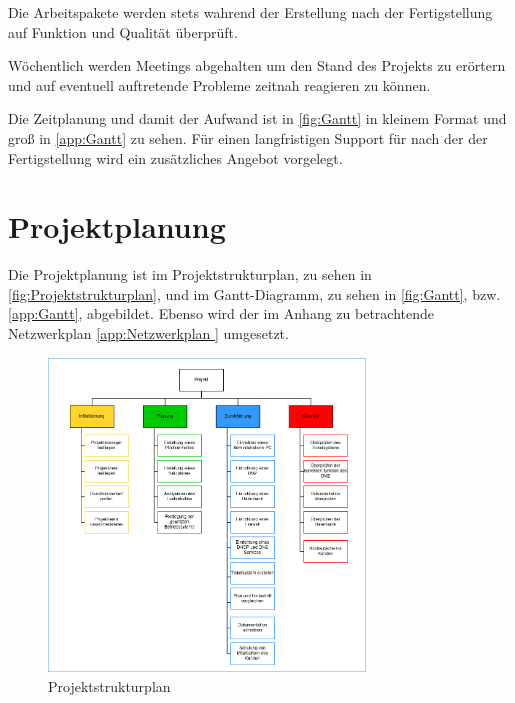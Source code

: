 \documentclass[a4paper,12pt,headings=small,ngerman,bibliography=totoc]{scrartcl}
\begin{document}
Die Arbeitspakete werden stets wahrend der Erstellung nach der Fertigstellung auf Funktion und Qualität überprüft.

Wöchentlich werden Meetings abgehalten um den Stand des Projekts zu erörtern und auf eventuell auftretende Probleme zeitnah reagieren zu können.

Die Zeitplanung und damit der Aufwand ist in \vref{fig:Gantt} in kleinem Format und groß in \vref{app:Gantt} zu sehen.  Für einen langfristigen Support für nach der der Fertigstellung wird ein zusätzliches Angebot vorgelegt.


\section{Projektplanung}

Die Projektplanung ist im Projektstrukturplan, zu sehen in \vref{fig:Projektstrukturplan}, und im Gantt-Diagramm, zu sehen in \vref{fig:Gantt}, bzw. \vref{app:Gantt}, abgebildet.
Ebenso wird der im Anhang  zu betrachtende Netzwerkplan \vref{app:Netzwerkplan } umgesetzt.

\begin{figure}[htbp]
  \centering
  \includegraphics[width=0.75\textwidth]{data/Projektstrukturplan.png}
  \caption{Projektstrukturplan}
  \label{fig:Projektstrukturplan}
\end{figure}
\end{document}
